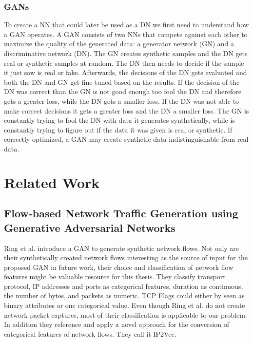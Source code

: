 \documentclass[
	ngerman,
	ruledheaders=section,%
	class=report,%
	thesis={type=bachelor},%
	accentcolor=9c,%
	custommargins=true,%
	marginpar=false,%
	parskip=half-,%
	fontsize=11pt,%
]{tudapub}
\begin{document}
\subsection{GANs}
\label{sec:GAN}

To create a NN that could later be used as a DN we first need to understand how a GAN operates.
A GAN consists of two NNs that compete against each other to maximize the quality of the generated data:
a generator network (GN) and a discriminative network (DN).
The GN creates synthetic samples and the DN gets real or synthetic samples at random.
The DN then needs to decide if the sample it just saw is real or fake.
Afterwards, the decisions of the DN gets evaluated and both the DN and GN get fine-tuned based on the results.
If the decision of the DN was correct than the GN is not good enough too fool the DN and therefore gets a greater loss, while the DN gets a smaller loss.
If the DN was not able to make correct decisions it gets a greater loss and the DN a smaller loss.
The GN is constantly trying to fool the DN with data it generates synthetically,
while is constantly trying to figure out if the data it was given is real or synthetic.
If correctly optimized, a GAN may create synthetic data indistinguishable from real data.

\chapter{Related Work}
\label{sec:relatedWork}

\section{Flow-based Network Traffic Generation using Generative Adversarial Networks}
\label{sec:ringGAN}

Ring et al. \cite{ringFlowbasedNetworkTraffic2019a} introduce a GAN to generate synthetic network flows.
Not only are their synthetically created network flows interesting as the source of input for the proposed GAN in future work,
their choice and classification of network flow features might be valuable resource for this thesis.
They classify transport protocol, IP addresses and ports as categorical features, duration as continuous, the number of bytes, and packets as numeric.
TCP Flags could either by seen as binary attributes or one categorical value.
Even though Ring et al. \cite{ringFlowbasedNetworkTraffic2019a} do not create network packet captures, most of their classification is applicable to our problem.
In addition they reference and apply a novel approach for the conversion of categorical features of network flows.
They call it IP2Vec.
\end{document}
